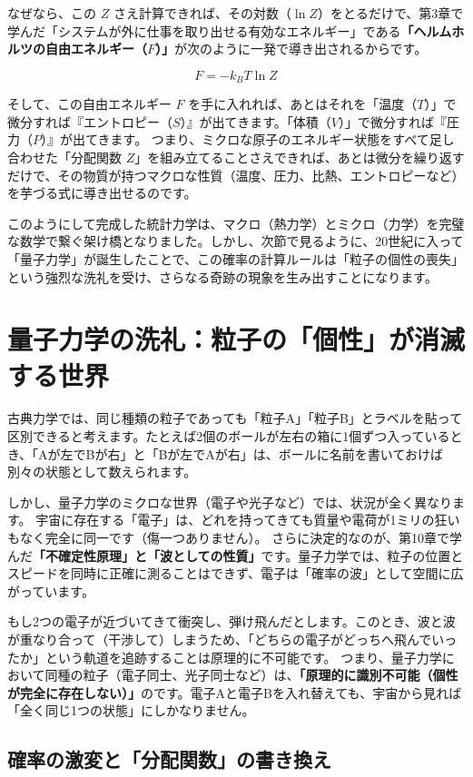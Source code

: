 なぜなら、この \(Z\) さえ計算できれば、その対数（\(\ln Z\)）をとるだけで、第3章で学んだ「システムが外に仕事を取り出せる有効なエネルギー」である\textbf{「ヘルムホルツの自由エネルギー（\(F\)）」}が次のように一発で導き出されるからです。

\[
F = -k_B T \ln Z
\]

そして、この自由エネルギー \(F\) を手に入れれば、あとはそれを「温度（\(T\)）」で微分すれば『エントロピー（\(S\)）』が出てきます。「体積（\(V\)）」で微分すれば『圧力（\(P\)）』が出てきます。 つまり、ミクロな原子のエネルギー状態をすべて足し合わせた「分配関数 \(Z\)」を組み立てることさえできれば、あとは微分を繰り返すだけで、その物質が持つマクロな性質（温度、圧力、比熱、エントロピーなど）を芋づる式に導き出せるのです。

このようにして完成した統計力学は、マクロ（熱力学）とミクロ（力学）を完璧な数学で繋ぐ架け橋となりました。しかし、次節で見るように、20世紀に入って「量子力学」が誕生したことで、この確率の計算ルールは「粒子の個性の喪失」という強烈な洗礼を受け、さらなる奇跡の現象を生み出すことになります。

\section{量子力学の洗礼：粒子の「個性」が消滅する世界}

古典力学では、同じ種類の粒子であっても「粒子A」「粒子B」とラベルを貼って区別できると考えます。たとえば2個のボールが左右の箱に1個ずつ入っているとき、「Aが左でBが右」と「Bが左でAが右」は、ボールに名前を書いておけば別々の状態として数えられます。

しかし、量子力学のミクロな世界（電子や光子など）では、状況が全く異なります。 宇宙に存在する「電子」は、どれを持ってきても質量や電荷が1ミリの狂いもなく完全に同一です（傷一つありません）。 さらに決定的なのが、第10章で学んだ\textbf{「不確定性原理」と「波としての性質」}です。量子力学では、粒子の位置とスピードを同時に正確に測ることはできず、電子は「確率の波」として空間に広がっています。

もし2つの電子が近づいてきて衝突し、弾け飛んだとします。このとき、波と波が重なり合って（干渉して）しまうため、「どちらの電子がどっちへ飛んでいったか」という軌道を追跡することは原理的に不可能です。 つまり、量子力学において同種の粒子（電子同士、光子同士など）は、\textbf{「原理的に識別不可能（個性が完全に存在しない）」}のです。電子Aと電子Bを入れ替えても、宇宙から見れば「全く同じ1つの状態」にしかなりません。

\subsection{確率の激変と「分配関数」の書き換え}


